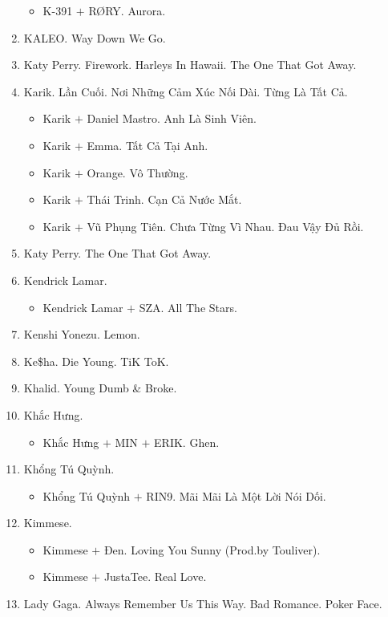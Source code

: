 \documentclass{article}
\begin{document}
\begin{enumerate}
\begin{itemize}
		\item {\sc K-391 $+$ R{\O}RY.} Aurora.
	\end{itemize}
	\item {\sc KALEO.} Way Down We Go.
	\item {\sc Katy Perry.} Firework. Harleys In Hawaii. The One That Got Away.
	\item {\sc Karik.} Lần Cuối. Nơi Những Cảm Xúc Nối Dài. Từng Là Tất Cả.
	\begin{itemize}
		\item {\sc Karik $+$ Daniel Mastro.} Anh Là Sinh Viên.
		\item {\sc Karik $+$ Emma.} Tất Cả Tại Anh.
		\item {\sc Karik $+$ Orange.} Vô Thường.
		\item {\sc Karik $+$ Thái Trinh.} Cạn Cả Nước Mắt.
		\item {\sc Karik $+$ Vũ Phụng Tiên.} Chưa Từng Vì Nhau. Đau Vậy Đủ Rồi.
	\end{itemize}	
	\item {\sc Katy Perry.} The One That Got Away.
	\item {\sc Kendrick Lamar.}
	\begin{itemize}
		\item {\sc Kendrick Lamar $+$ SZA.} All The Stars.
	\end{itemize}
	\item {\sc Kenshi Yonezu.} Lemon.
	\item {\sc Ke\$ha.} Die Young. TiK ToK.
	\item {\sc Khalid.} Young Dumb \& Broke.
	\item {\sc Khắc Hưng.}
	\begin{itemize}
		\item {\sc Khắc Hưng $+$ MIN $+$ ERIK.} Ghen.
	\end{itemize}
	\item {\sc Khổng Tú Quỳnh.}
	\begin{itemize}
		\item {\sc Khổng Tú Quỳnh $+$ RIN9.} Mãi Mãi Là Một Lời Nói Dối.
	\end{itemize}
	\item {\sc Kimmese.}
	\begin{itemize}
		\item {\sc Kimmese $+$ Đen.} Loving You Sunny (Prod.by Touliver).
		\item {\sc Kimmese $+$ JustaTee.} Real Love.
	\end{itemize}
	\item {\sc Lady Gaga.} Always Remember Us This Way. Bad Romance. Poker Face.

\end{enumerate}
\end{document}
